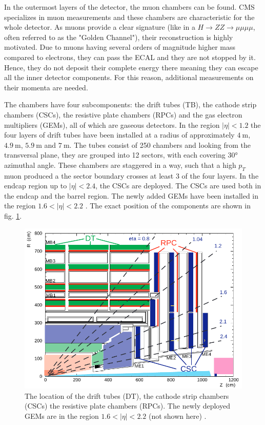 
In the outermost layers of the detector, the muon chambers can be found. CMS specializes in muon measurements and these chambers are characteristic for the whole detector. As muons provide a clear signature (like in a $H \rightarrow ZZ \rightarrow \mu\mu\mu\mu$, often referred to as the "Golden Channel"), their reconstruction is highly motivated. Due to muons having several orders of magnitude higher mass compared to electrons, they can pass the ECAL and they are not stopped by it.  Hence, they do not deposit their complete energy there meaning they can escape all the inner detector components. For this reason, additional measurements on their momenta are needed.

The chambers have four subcomponents: the drift tubes (TB), the cathode strip chambers (CSCs), the resistive plate chambers (RPCs) and the gas electron multipliers (GEMs), all of which are gaseous detectors. In the region $|\eta|<1.2$ the four layers of drift tubes have been installed at a radius of approximately $\SI{4}{\meter}$, $\SI{4.9}{\meter}$, $\SI{5.9}{\meter}$ and $\SI{7}{\meter}$. The tubes consist of 250 chambers and looking from the transversal plane, they are grouped into 12 sectors, with each covering 30° azimuthal angle. These chambers are staggered in a way, such that a high $p_T$ muon produced a the sector boundary crosses at least 3 of the four layers. In the endcap region up to $|\eta| < 2.4$, the CSCs are deployed. The CSCs are used both in the endcap and the barrel region. The newly added GEMs have been installed in the region $1.6 < |\eta| < 2.2$ \cite{Colaleo:2021453}. The exact position of the components are shown in fig. \ref{fig:muonchambers}.

\begin{figure}[h!]
	\centering
	\includegraphics[width=0.8\linewidth]{figures/experiment/muonchambers.pdf}
	\caption{The location of the drift tubes (DT), the cathode strip chambers (CSCs) the resistive plate chambers (RPCs). The newly deployed GEMs are in the region $1.6 < |\eta| < 2.2$ (not shown here) \cite{Bayatian:922757}.}
	\label{fig:muonchambers}
\end{figure}

